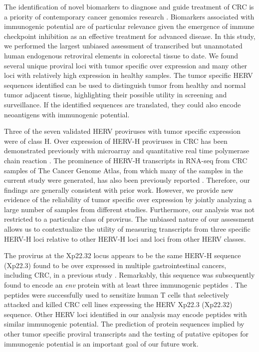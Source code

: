 The identification of novel biomarkers to diagnose and guide treatment of CRC is a priority of contemporary cancer genomics research \citep{Sveen2019}.
Biomarkers associated with immunogenic potential are of particular relevance given the emergence of immune checkpoint inhibition as an effective treatment for advanced disease.
In this study, we performed the largest unbiased assessment of transcribed but unannotated human endogenous retroviral elements in colorectal tissue to date.
We found several unique proviral loci with tumor specific over expression and many other loci with relatively high expression in healthy samples.
The tumor specific HERV sequences identified can be used to distinguish tumor from healthy and normal tumor adjacent tissue, highlighting their possible utility in screening and surveillance.
If the identified sequences are translated, they could also encode neoantigens with immunogenic potential.

Three of the seven validated HERV proviruses with tumor specific expression were of class H.
Over expression of HERV-H proviruses in CRC has been demonstrated previously with microarray \citep{Perot2012} and quantitative real time polymerase chain reaction \citep{Perot2015}.
The prominence of HERV-H transcripts in RNA-seq from CRC samples of The Cancer Genome Atlas, from which many of the samples in the current study were generated, has also been previously reported \citep{Desai2017, Attig2019}.
Therefore, our findings are generally consistent with prior work.
However, we provide new evidence of the reliability of tumor specific over expression by jointly analyzing a large number of samples from different studies.
Furthermore, our analysis was not restricted to a particular class of provirus.
The unbiased nature of our assessment allows us to contextualize the utility of measuring transcripts from three specific HERV-H loci relative to other HERV-H loci and loci from other HERV classes.

The provirus at the Xp22.32 locus appears to be the same HERV-H sequence (Xp22.3) found to be over expressed in multiple gastrointestinal cancers, including CRC, in a previous study \citep{Wentzensen2007}.
Remarkably, this sequence was subsequently found to encode an \emph{env} protein with at least three immunogenic peptides \citep{Mullins2012}.
The peptides were successfully used to sensitize human T cells that selectively attacked and killed CRC cell lines expressing the HERV Xp22.3 (Xp22.32) sequence.
Other HERV loci identified in our analysis may encode peptides with similar immunogenic potential.
The prediction of protein sequences implied by other tumor specific proviral transcripts and the testing of putative epitopes for immunogenic potential is an important goal of our future work.

